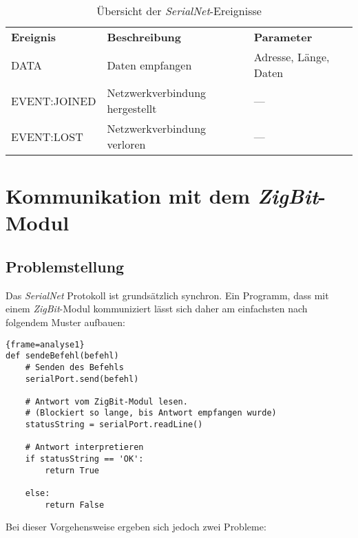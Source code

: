                 \begin{table}
                    \begin{tabular}{lll}
                        \textbf{Ereignis} & \textbf{Beschreibung} & \textbf{Parameter}\\
                            DATA         & Daten empfangen & Adresse, Länge, Daten \\
                            EVENT:JOINED & Netzwerkverbindung hergestellt & --- \\
                            EVENT:LOST   & Netzwerkverbindung verloren & --- \\
                     \end{tabular}
                     \caption{Übersicht der \emph{SerialNet}-Ereignisse}
                     \label{serialnet_events}
                \end{table}


    \section{Kommunikation mit dem \emph{ZigBit}-Modul}\label{analyse_kommunikation_mit_zigbit_modul}
        \subsection{Problemstellung}
            Das \emph{SerialNet} Protokoll ist grundsätzlich synchron. Ein Programm, dass mit
            einem \emph{ZigBit}-Modul kommuniziert lässt sich daher am einfachsten nach folgendem
            Muster aufbauen:

            \begin{lstlisting}{frame=analyse1}
def sendeBefehl(befehl)
    # Senden des Befehls
    serialPort.send(befehl)

    # Antwort vom ZigBit-Modul lesen.
    # (Blockiert so lange, bis Antwort empfangen wurde)
    statusString = serialPort.readLine()

    # Antwort interpretieren
    if statusString == 'OK':
        return True
    
    else:
        return False
            \end{lstlisting}
           
        
            Bei dieser Vorgehensweise ergeben sich jedoch zwei Probleme:

